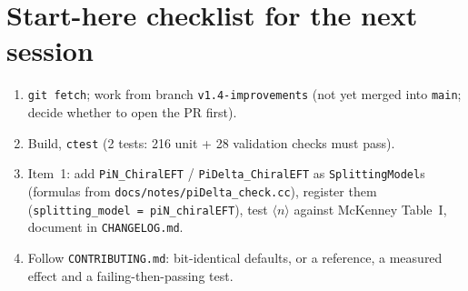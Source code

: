 \documentclass[11pt,a4paper]{article}
\newcommand{\code}[1]{\texttt{#1}}
\begin{document}
\section{Start-here checklist for the next session}
\begin{enumerate}
\item \code{git fetch}; work from branch \code{v1.4-improvements} (not yet
  merged into \code{main}; decide whether to open the PR first).
\item Build, \code{ctest} (2 tests: 216 unit + 28 validation checks must pass).
\item Item~1: add \code{PiN\_ChiralEFT} / \code{PiDelta\_ChiralEFT} as
  \code{SplittingModel}s (formulas from \code{docs/notes/piDelta\_check.cc}),
  register them (\code{splitting\_model = piN\_chiralEFT}), test
  $\langle n\rangle$ against McKenney Table~I, document in \code{CHANGELOG.md}.
\item Follow \code{CONTRIBUTING.md}: bit-identical defaults, or a reference,
  a measured effect and a failing-then-passing test.
\end{enumerate}
\end{document}
